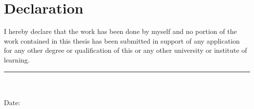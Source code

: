 \chapter*{Declaration}

I hereby declare that the work has been done by myself and no portion of the work contained in this thesis has been submitted in support of any application for any other degree or qualification of this or any other university or institute of learning.

\vspace{2cm}

\noindent\rule{6cm}{0.4pt}\\
\thesisauthor\\
Date:

